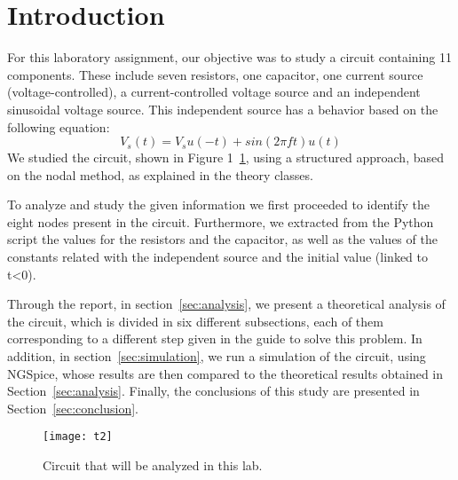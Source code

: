 \pagebreak
\section{Introduction}
\label{sec:introduction}


For this laboratory assignment, our objective was to study a circuit containing 11 components. These include seven resistors, one capacitor, one current source (voltage-controlled), a current-controlled voltage source and an independent sinusoidal voltage source. This independent source has a behavior based on the following equation: 
\begin {equation}
V_s(t) = V_s u(-t) + sin(2\pi f t)u(t)
\end {equation}
We studied the circuit, shown in Figure 1~\ref{fig:circuit}, using a structured approach, based on the nodal method, as explained in the theory classes.

To analyze and study the given information we first proceeded to identify the eight nodes present in the circuit. Furthermore, we extracted from the Python script the values for the resistors and the capacitor, as well as the values of the constants related with the independent source and the initial value (linked to t<0). 

Through the report, in section~\ref{sec:analysis}, we present a theoretical analysis of the circuit, which is divided in six different subsections, each of them corresponding to a different step given in the guide to solve this problem. In addition, in section~\ref{sec:simulation}, we run a simulation of the circuit, using NGSpice, whose results are then compared to the theoretical results obtained in Section~\ref{sec:analysis}. Finally, the conclusions of this study are presented in Section~\ref{sec:conclusion}.

\begin{figure}[h] 
	\centering
	\texttt{[image: t2]}
	\caption{Circuit that will be analyzed in this lab.}
	\label{fig:circuit}
\end{figure}

